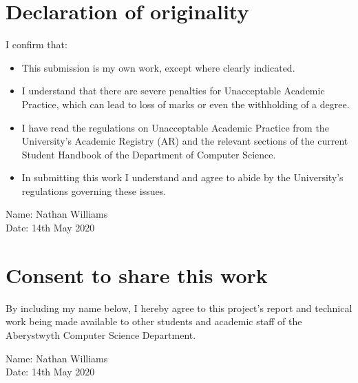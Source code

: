 \thispagestyle{empty}


\section*{\centering Declaration of originality}

I confirm that:

\begin{itemize}
\item{This submission is my own work, except where 
clearly indicated.}

\item{I understand that there are severe penalties for Unacceptable Academic Practice, which can lead to loss of marks or even the withholding of a degree.}
 
\item{I have read the regulations on Unacceptable Academic Practice from the University's Academic Registry (AR) and the relevant sections of the current Student Handbook of the Department of Computer Science.}
 
\item{In submitting this work I understand and agree to abide by the University's regulations governing these issues.}
\end{itemize}

\vspace{2em}
Name: Nathan Williams  \\

\vspace{1em}
Date:  14th May 2020 \\

\vspace{1em}
\section*{\centering Consent to share this work}

By including my name below, I hereby agree to this project's report and technical work being made available to other students and academic staff of the Aberystwyth Computer Science Department.  

\vspace{2em}
Name: Nathan Williams  \\

\vspace{1em}
Date:  14th May 2020 \\


